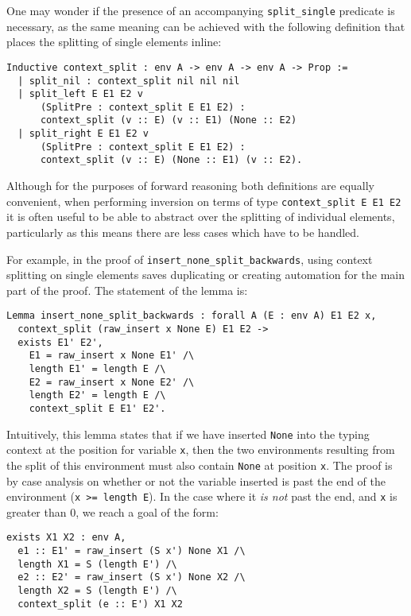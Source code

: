 \documentclass[]{unswthesis}
\let\c\texttt
\let\i\textit
\begin{document}
One may wonder if the presence of an accompanying \c{split_single} predicate is necessary, as the same meaning can be achieved with the following definition that places the splitting of single elements inline:

\begin{verbatim}
Inductive context_split : env A -> env A -> env A -> Prop :=
  | split_nil : context_split nil nil nil
  | split_left E E1 E2 v
  	  (SplitPre : context_split E E1 E2) :
  	  context_split (v :: E) (v :: E1) (None :: E2)
  | split_right E E1 E2 v
  	  (SplitPre : context_split E E1 E2) :
  	  context_split (v :: E) (None :: E1) (v :: E2).
\end{verbatim}

Although for the purposes of forward reasoning both definitions are equally convenient, when performing inversion on terms of type \c{context_split E E1 E2} it is often useful to be able to abstract over the splitting of individual elements, particularly as this means there are less cases which have to be handled.

For example, in the proof of \c{insert_none_split_backwards}, using context splitting on single elements saves duplicating or creating automation for the main part of the proof. The statement of the lemma is:

\begin{verbatim}
Lemma insert_none_split_backwards : forall A (E : env A) E1 E2 x,
  context_split (raw_insert x None E) E1 E2 ->
  exists E1' E2',
    E1 = raw_insert x None E1' /\
    length E1' = length E /\
    E2 = raw_insert x None E2' /\
    length E2' = length E /\
    context_split E E1' E2'.
\end{verbatim}

Intuitively, this lemma states that if we have inserted \c{None} into the typing context at the position for variable \c{x}, then the two environments resulting from the split of this environment must also contain \c{None} at position \c{x}. The proof is by case analysis on whether or not the variable inserted is past the end of the environment (\c{x >= length E}). In the case where it \i{is not} past the end, and \c{x} is greater than 0, we reach a goal of the form:

\begin{verbatim}
exists X1 X2 : env A,
  e1 :: E1' = raw_insert (S x') None X1 /\
  length X1 = S (length E') /\
  e2 :: E2' = raw_insert (S x') None X2 /\
  length X2 = S (length E') /\
  context_split (e :: E') X1 X2
\end{verbatim}
\end{document}
